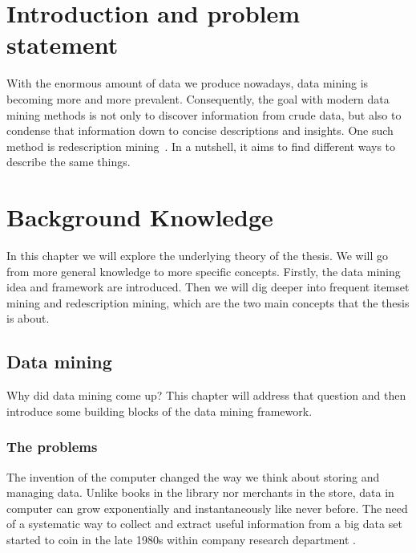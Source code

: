 \chapter{Introduction and problem statement}
\label{cha:intro}
With the enormous amount of data we produce nowadays, data mining is becoming more and more prevalent.
Consequently, the goal with modern data mining methods is not only to discover information from crude data, but also to condense that information down to concise descriptions and insights.
One such method is redescription mining~\citep{ramakrishnan_turning_2004}.
In a nutshell, it aims to find different ways to describe the same things.

\chapter{Background Knowledge}
\label{cha:background}
In this chapter we will explore the underlying theory of the thesis.
We will go from more general knowledge to more specific concepts.
Firstly, the data mining idea and framework are introduced.
Then we will dig deeper into frequent itemset mining and redescription mining, which are the two main concepts that the thesis is about.
\section{Data mining}
Why did data mining come up?
This chapter will address that question and then introduce some building blocks of the data mining framework.
\subsection{The problems}
\label{sub:the_problems}
The invention of the computer changed the way we think about storing and managing data.
Unlike books in the library nor merchants in the store, data in computer can grow exponentially and instantaneously like never before.
The need of a systematic way to collect and extract useful information from a big data set started to coin in the late 1980s within company research department  \citep{coenen_datamining_2011}.

